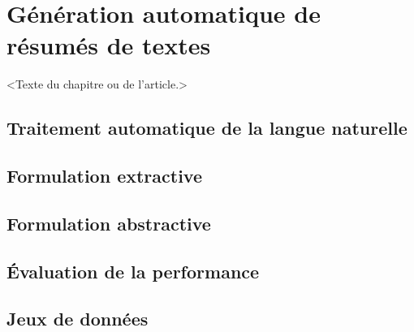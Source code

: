 \chapter{Génération automatique de résumés de textes}     %
\label{chap:generation_resumes}                           %

<Texte du chapitre ou de l'article.>

\section{Traitement automatique de la langue naturelle}

\section{Formulation extractive}

\section{Formulation abstractive}

\section{Évaluation de la performance}

\section{Jeux de données}